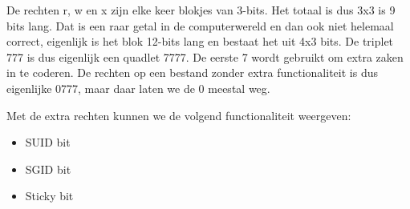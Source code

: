  De rechten r, w en x zijn elke keer blokjes van 3-bits. Het totaal is dus 3x3 is 9 bits lang. Dat is een raar getal in de computerwereld en dan ook niet helemaal correct, eigenlijk is het blok 12-bits lang en bestaat het uit 4x3 bits. De triplet 777 is dus eigenlijk een quadlet 7777. De eerste 7 wordt gebruikt om extra zaken in te coderen. De rechten op een bestand zonder extra functionaliteit is dus eigenlijke 0777, maar daar laten we de 0 meestal weg.

Met de extra rechten kunnen we de volgend functionaliteit weergeven:
\begin{itemize}
\item SUID bit
\item SGID bit
\item Sticky bit
\end{itemize}

